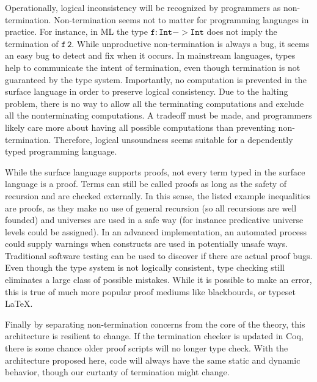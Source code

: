 
Operationally, logical inconsistency will be recognized by programmers as non-termination.
Non-termination seems not to matter for programming languages in practice.
For instance, in ML the type $\mathtt{f:Int->Int}$ does not imply the termination of $\mathtt{f\,2}$.
While unproductive non-termination is always a bug, it seems an easy bug to detect and fix when it occurs.
In mainstream languages, types help to communicate the intent of termination, even though termination is not guaranteed by the type system.
Importantly, no computation is prevented in the surface language in order to preserve logical consistency.
Due to the halting problem, there is no way to allow all the terminating computations and exclude all the nonterminating computations.
A tradeoff must be made, and programmers likely care more about having all possible computations than preventing non-termination.
Therefore, logical unsoundness seems suitable for a dependently typed programming language.



While the surface language supports proofs, not every term typed in the surface language is a proof.
Terms can still be called proofs as long as the safety of recursion and \tit{} are checked externally.
In this sense, the listed example inequalities are proofs, as they make no use of general recursion (so all recursions are well founded) and universes are used in a safe way (for instance predicative universe levels could be assigned).
In an advanced implementation, an automated process could supply warnings when constructs are used in potentially unsafe ways.
Traditional software testing can be used to discover if there are actual proof bugs.
Even though the type system is not logically consistent, type checking still eliminates a large class of possible mistakes.
While it is possible to make an error, this is true of much more popular proof mediums like blackbourds, or typeset \LaTeX.

Finally by separating non-termination concerns from the core of the theory, this architecture is resilient to change.
If the termination checker is updated in Coq, there is some chance older proof scripts will no longer type check.
With the architecture proposed here, code will always have the same static and dynamic behavior, though our curtanty of termination might change.

